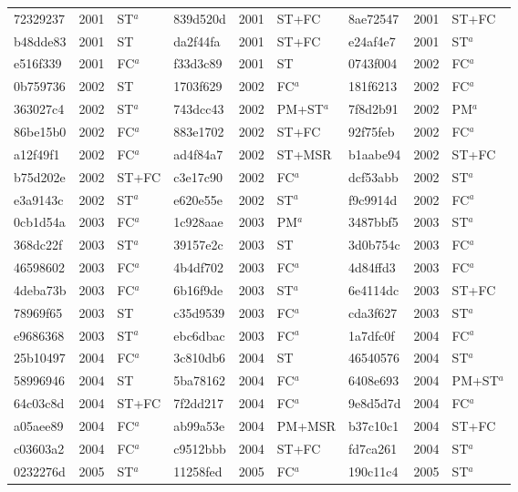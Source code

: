 \begin{longtable}{lll@{\hspace{10pt}}lll@{\hspace{10pt}}lll}
72329237 & 2001 & ST$^{a}$ & 839d520d & 2001 & ST+FC & 8ae72547 & 2001 & ST+FC \\
b48dde83 & 2001 & ST & da2f44fa & 2001 & ST+FC & e24af4e7 & 2001 & ST$^{a}$ \\
e516f339 & 2001 & FC$^{a}$ & f33d3c89 & 2001 & ST & 0743f004 & 2002 & FC$^{a}$ \\
0b759736 & 2002 & ST & 1703f629 & 2002 & FC$^{a}$ & 181f6213 & 2002 & FC$^{a}$ \\
363027c4 & 2002 & ST$^{a}$ & 743dcc43 & 2002 & PM+ST$^{a}$ & 7f8d2b91 & 2002 & PM$^{a}$ \\
86be15b0 & 2002 & FC$^{a}$ & 883e1702 & 2002 & ST+FC & 92f75feb & 2002 & FC$^{a}$ \\
a12f49f1 & 2002 & FC$^{a}$ & ad4f84a7 & 2002 & ST+MSR & b1aabe94 & 2002 & ST+FC \\
b75d202e & 2002 & ST+FC & c3e17c90 & 2002 & FC$^{a}$ & dcf53abb & 2002 & ST$^{a}$ \\
e3a9143c & 2002 & ST$^{a}$ & e620e55e & 2002 & ST$^{a}$ & f9c9914d & 2002 & FC$^{a}$ \\
0cb1d54a & 2003 & FC$^{a}$ & 1c928aae & 2003 & PM$^{a}$ & 3487bbf5 & 2003 & ST$^{a}$ \\
368dc22f & 2003 & ST$^{a}$ & 39157e2c & 2003 & ST & 3d0b754c & 2003 & FC$^{a}$ \\
46598602 & 2003 & FC$^{a}$ & 4b4df702 & 2003 & FC$^{a}$ & 4d84ffd3 & 2003 & FC$^{a}$ \\
4deba73b & 2003 & FC$^{a}$ & 6b16f9de & 2003 & ST$^{a}$ & 6e4114dc & 2003 & ST+FC \\
78969f65 & 2003 & ST & c35d9539 & 2003 & FC$^{a}$ & cda3f627 & 2003 & ST$^{a}$ \\
e9686368 & 2003 & ST$^{a}$ & ebc6dbac & 2003 & FC$^{a}$ & 1a7dfc0f & 2004 & FC$^{a}$ \\
25b10497 & 2004 & FC$^{a}$ & 3c810db6 & 2004 & ST & 46540576 & 2004 & ST$^{a}$ \\
58996946 & 2004 & ST & 5ba78162 & 2004 & FC$^{a}$ & 6408e693 & 2004 & PM+ST$^{a}$ \\
64c03c8d & 2004 & ST+FC & 7f2dd217 & 2004 & FC$^{a}$ & 9e8d5d7d & 2004 & FC$^{a}$ \\
a05aee89 & 2004 & FC$^{a}$ & ab99a53e & 2004 & PM+MSR & b37c10c1 & 2004 & ST+FC \\
c03603a2 & 2004 & FC$^{a}$ & c9512bbb & 2004 & ST+FC & fd7ca261 & 2004 & ST$^{a}$ \\
0232276d & 2005 & ST$^{a}$ & 11258fed & 2005 & FC$^{a}$ & 190c11c4 & 2005 & ST$^{a}$ \\

\end{longtable}
